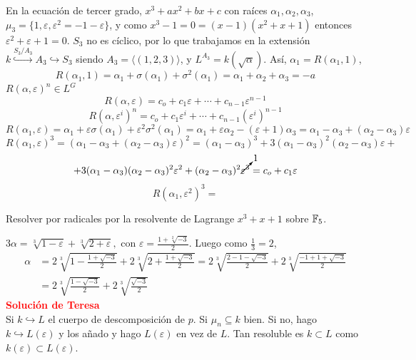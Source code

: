 \begin{ejem}
    En la ecuaci\'on de tercer grado, $x^3 + ax^2 + bx+c$ con ra\'ices $ \alpha_1 , \alpha_2,  \alpha_3$, $\mu_3  = \{1,\varepsilon, \varepsilon^2 = -1-\varepsilon\}$, y como $x^3-1 = 0 = (x-1)(x^2+x+1)$ entonces $\varepsilon^2+ \varepsilon +1=0$. $S_3$ no es c\'iclico, por lo que trabajamos en la extensi\'on $k \overset{S_3/A_3}{\hookrightarrow} A_3 \hookrightarrow S_3$ siendo $A_3 = \langle (1,2,3)\rangle$, y $L^{A_3} = k (\sqrt{\alpha})$. As\'i, $\alpha_1 = R(\alpha_1,1)$, 
    $$R( \alpha_1 ,1) = \alpha_1 +\sigma( \alpha_1 ) + \sigma^2( \alpha_1) =  \alpha_1 + \alpha_2+ \alpha_3 = -a$$
    $R(\alpha, \varepsilon)^n \in L^G $
    $$R(\alpha, \varepsilon) = c_o + c_1\varepsilon + \cdots + c_{n-1} \varepsilon^{n-1}$$
    $$R(\alpha, \varepsilon^i)^n = c_o + c_1 \varepsilon^i + \cdots +  c_{n-1} (\varepsilon^i)^{n-1}$$
    $$R(\alpha_1, \varepsilon) = \alpha_1 + \varepsilon \sigma(\alpha_1) + \varepsilon^2 \sigma^2(\alpha_1) = \alpha_1 + \varepsilon\alpha_2 - (\varepsilon+1) \alpha_3 =\alpha_1 - \alpha_3 + (\alpha_2 - \alpha_3)\varepsilon$$
    $$R(\alpha_1, \varepsilon)^3 = (\alpha_1 - \alpha_3 + (\alpha_2 - \alpha_3) \varepsilon)^2 = (\alpha_1-\alpha_3)^3 + 3(\alpha_1-\alpha_3)^2 (\alpha_2 - \alpha_3) \varepsilon + $$ 
    $$ + 3 (\alpha_1-\alpha_3)(\alpha_2-\alpha_3)^2 \varepsilon^2 + (\alpha_2 - \alpha_3)^2 \cancelto{1}{\varepsilon^3}= c_o + c_1\varepsilon$$
    $$R(\alpha_1, \varepsilon^2)^3 = $$
\end{ejem}
\begin{ejer}
    Resolver por radicales por la resolvente de Lagrange $x^3+x+1$ sobre $\mathbb{F}_5$. 
\end{ejer}
\noindent $3 \alpha = \sqrt[3]{1-\varepsilon} + \sqrt[3]{2+\varepsilon}, \text{ con } \varepsilon = \frac{1+\sqrt[2]{-3}}{2}$. Luego como $\frac{1}{3} = 2$, 
\begin{align*}\alpha & = 2\sqrt[3]{1 - \frac{1+\sqrt{-3}}{2}} +2 \sqrt[3]{2 + \frac{1+\sqrt{-3}}{2}} = 2 \sqrt[3]{\frac{2-1-\sqrt{-3}}{2}} + 2 \sqrt[3]{\frac{-1+1+\sqrt{-3}}{2}} \\ & = 2 \sqrt[3]{\frac{1-\sqrt{-3}}{2}} +2 \sqrt[3]{\frac{\sqrt{-3}}{2}}\end{align*}
\noindent \textcolor{red}{\textbf{Soluci\'on de Teresa}} \\
Si $k \hookrightarrow L $ el cuerpo de descomposici\'on de $p$. Si $\mu_n \subseteq k$ bien. Si no, hago $k \hookrightarrow L(\varepsilon)$ y los añado y hago $L(\varepsilon)$ en vez de $L$. Tan resoluble es $k \subset L$ como $k(\varepsilon) \subset L(\varepsilon)$.

